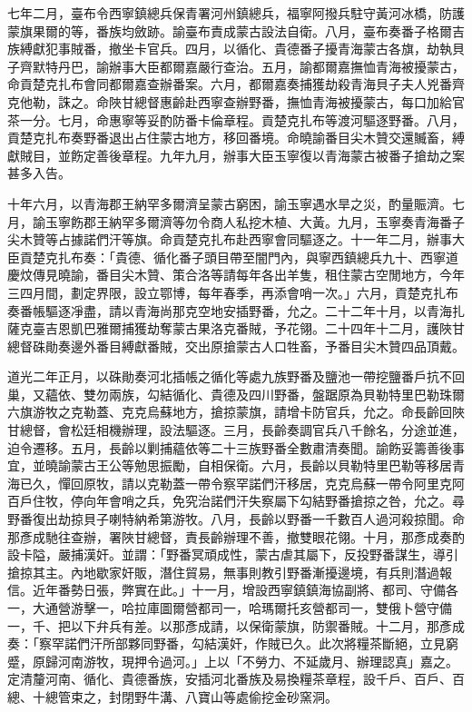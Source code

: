\begin{pinyinscope}
七年二月，臺布令西寧鎮總兵保青署河州鎮總兵，福寧阿撥兵駐守黃河冰橋，防護蒙旗果爾的等，番族均斂跡。諭臺布責成蒙古設法自衛。八月，臺布奏番子格爾吉族縛獻犯事賊番，撤坐卡官兵。四月，以循化、貴德番子擾青海蒙古各旗，劫執貝子齊默特丹巴，諭辦事大臣都爾嘉嚴行查治。五月，諭都爾嘉撫恤青海被擾蒙古，命貢楚克扎布會同都爾嘉查辦番案。六月，都爾嘉奏捕獲劫殺青海貝子夫人兇番齊克他勒，誅之。命陜甘總督惠齡赴西寧查辦野番，撫恤青海被擾蒙古，每口加給官茶一分。七月，命惠寧等妥酌防番卡倫章程。貢楚克扎布等渡河驅逐野番。八月，貢楚克扎布奏野番退出占住蒙古地方，移回番境。命曉諭番目尖木贊交還贓畜，縛獻賊目，並飭定善後章程。九年九月，辦事大臣玉寧復以青海蒙古被番子搶劫之案甚多入告。

十年六月，以青海郡王納罕多爾濟呈蒙古窮困，諭玉寧遇水旱之災，酌量賑濟。七月，諭玉寧飭郡王納罕多爾濟等勿令商人私挖木植、大黃。九月，玉寧奏青海番子尖木贊等占據諾們汗等旗。命貢楚克扎布赴西寧會同驅逐之。十一年二月，辦事大臣貢楚克扎布奏：「貴德、循化番子頭目帶至闇門內，與寧西鎮總兵九十、西寧道慶炆傳見曉諭，番目尖木贊、策合洛等請每年各出羊隻，租住蒙古空閒地方，今年三四月間，劃定界限，設立鄂博，每年春季，再添會哨一次。」六月，貢楚克扎布奏番帳驅逐凈盡，請以青海尚那克空地安插野番，允之。二十二年十月，以青海扎薩克臺吉恩凱巴雅爾捕獲劫奪蒙古果洛克番賊，予花翎。二十四年十二月，護陜甘總督硃勛奏邊外番目縛獻番賊，交出原搶蒙古人口牲畜，予番目尖木贊四品頂戴。

道光二年正月，以硃勛奏河北插帳之循化等處九族野番及鹽池一帶挖鹽番戶抗不回巢，又蘊依、雙勿兩族，勾結循化、貴德及四川野番，盤踞原為貝勒特里巴勒珠爾六旗游牧之克勒蓋、克克烏蘇地方，搶掠蒙旗，請增卡防官兵，允之。命長齡回陜甘總督，會松廷相機辦理，設法驅逐。三月，長齡奏調官兵八千餘名，分途並進，迫令遷移。五月，長齡以剿捕蘊依等二十三族野番全數肅清奏聞。諭飭妥籌善後事宜，並曉諭蒙古王公等勉思振勵，自相保衛。六月，長齡以貝勒特里巴勒等移居青海已久，憚回原牧，請以克勒蓋一帶令察罕諾們汗移居，克克烏蘇一帶令阿里克阿百戶住牧，停向年會哨之兵，免究治諾們汗失察屬下勾結野番搶掠之咎，允之。尋野番復出劫掠貝子喇特納希第游牧。八月，長齡以野番一千數百人過河殺掠聞。命那彥成馳往查辦，署陜甘總督，責長齡辦理不善，撤雙眼花翎。十月，那彥成奏酌設卡隘，嚴捕漢奸。並謂：「野番冥頑成性，蒙古虐其屬下，反投野番謀生，導引搶掠其主。內地歇家奸販，潛住貿易，無事則教引野番漸擾邊境，有兵則潛過報信。近年番勢日張，弊實在此。」十一月，增設西寧鎮鎮海協副將、都司、守備各一，大通營游擊一，哈拉庫圖爾營都司一，哈瑪爾托亥營都司一，雙俄卜營守備一，千、把以下弁兵有差。以那彥成請，以保衛蒙旗，防禦番賊。十二月，那彥成奏：「察罕諾們汗所部夥同野番，勾結漢奸，作賊已久。此次將糧茶斷絕，立見窮蹙，原歸河南游牧，現押令過河。」上以「不勞力、不延歲月、辦理認真」嘉之。定清釐河南、循化、貴德番族，安插河北番族及易換糧茶章程，設千戶、百戶、百總、十總管束之，封閉野牛溝、八寶山等處偷挖金砂窯洞。


\end{pinyinscope}
